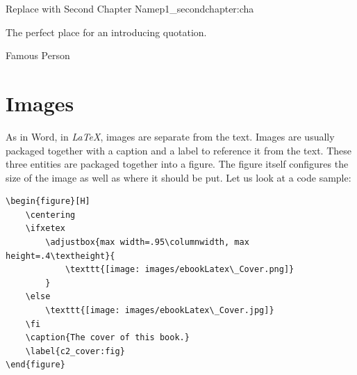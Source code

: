 


\begin{chapterpage}{Replace with Second Chapter Name}{p1_secondchapter:cha}

\begin{myquotation} The perfect place for an introducing quotation.\par\vspace*{15mm}
\mbox{}\hfill \emdash{}Famous Person
\par\end{myquotation}

\end{chapterpage}



\section{Images}\label{c2_images:sec}

As in Word, in \textit{LaTeX}, images are separate from the text. Images are usually packaged together with a caption and a label to reference it from the text. These three entities are packaged together into a figure. The figure itself configures the size of the image as well as where it should be put. Let us look at a code sample:
\begin{lstlisting}
\begin{figure}[H]
	\centering
	\ifxetex
		\adjustbox{max width=.95\columnwidth, max height=.4\textheight}{
			\texttt{[image: images/ebookLatex\_Cover.png]}
		}
	\else
		\texttt{[image: images/ebookLatex\_Cover.jpg]}
	\fi
	\caption{The cover of this book.}
	\label{c2_cover:fig}
\end{figure}
\end{lstlisting}

